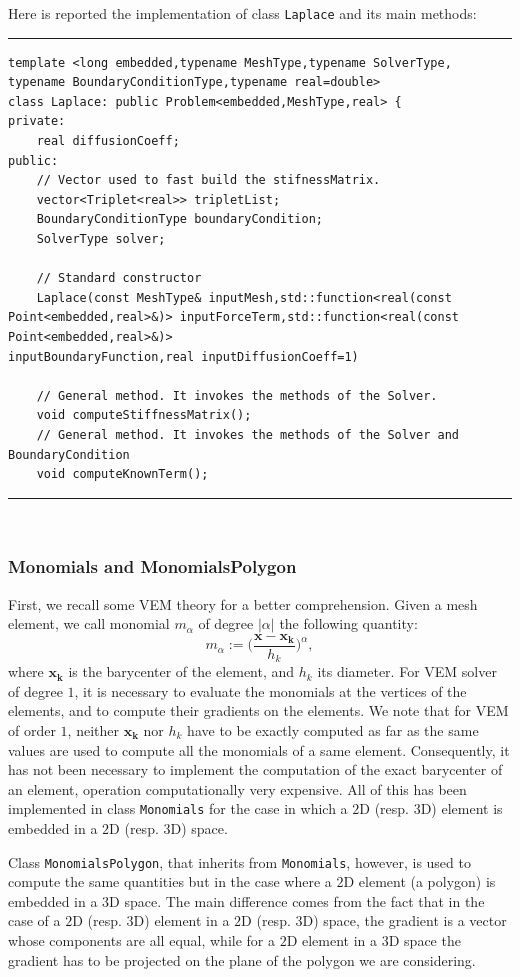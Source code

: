 Here is reported the implementation of class \verb|Laplace| and its main methods:

\noindent\rule{12.7cm}{1pt}

\begin{lstlisting}[caption=File \texttt{Laplace.h}]
template <long embedded,typename MeshType,typename SolverType,
typename BoundaryConditionType,typename real=double>
class Laplace: public Problem<embedded,MeshType,real> {
private:
    real diffusionCoeff;	
public:
    // Vector used to fast build the stifnessMatrix.
    vector<Triplet<real>> tripletList; 
    BoundaryConditionType boundaryCondition;
    SolverType solver;

    // Standard constructor
    Laplace(const MeshType& inputMesh,std::function<real(const 
Point<embedded,real>&)> inputForceTerm,std::function<real(const 
Point<embedded,real>&)> 
inputBoundaryFunction,real inputDiffusionCoeff=1)

    // General method. It invokes the methods of the Solver.
    void computeStiffnessMatrix();
    // General method. It invokes the methods of the Solver and BoundaryCondition 
    void computeKnownTerm();
\end{lstlisting}
\noindent\rule{12.7cm}{1pt}\\

\subsubsection{Monomials and MonomialsPolygon}
First, we recall some VEM theory for a better comprehension. Given a mesh element, we call monomial $m_\alpha$ of degree $|\alpha|$ the following quantity:
$$
m_\alpha:=\bigg( \frac{\mathbf{x}-\mathbf{x_k}}{h_k} \bigg) ^\alpha,
$$
where $\mathbf{x_k}$ is the barycenter of the element, and $h_k$ its diameter. For VEM solver of degree $1$, it is necessary to evaluate the monomials at the vertices of the elements, and to compute their gradients on the elements. 
We note that for VEM of order $1$, neither $\mathbf{x_k}$ nor $h_k$ have to be exactly computed as far as the same values are used to compute all the monomials of a same element. Consequently, it has not been necessary to implement the computation of the exact barycenter of an element, operation computationally very expensive. 
All of this has been implemented in class \verb|Monomials| for the case in which a $2$D (resp. $3$D) element is embedded in a $2$D (resp. $3$D) space.

Class \verb|MonomialsPolygon|, that inherits from  \verb|Monomials|, however, is used to compute the same quantities but in the case where a $2$D element (a polygon) is embedded in a $3$D space. The main difference comes from the fact that in the case of a $2$D (resp. $3$D) element in a $2$D (resp. $3$D) space, the gradient is a vector whose components are all equal, while for a $2$D element in a $3$D space the gradient has to be projected on the plane of the polygon we are considering.\\

